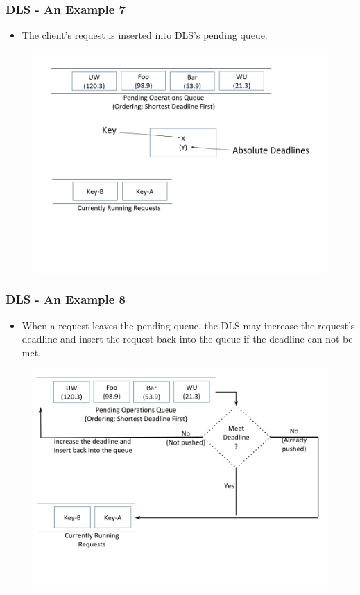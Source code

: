 \documentclass{beamer}
\begin{document}
\begin{frame}
  \frametitle{DLS - An Example 7}
  \begin{itemize}
  \item The client's request is inserted into DLS's pending queue.
  \end{itemize}
  \begin{figure}
    \begin{center}
      \centerline{\includegraphics[scale=0.38]{img/DLS_Example8.png}}
    \end{center}
  \end{figure}
\end{frame}

\begin{frame}
  \frametitle{DLS - An Example 8}
  \begin{itemize}
  \item When a request leaves the pending queue, the DLS may increase the
    request's deadline and insert the request back into the queue if the
    deadline can not be met.
  \end{itemize}
  \begin{figure}
    \begin{center}
      \centerline{\includegraphics[scale=0.35]{img/DLS_Example9.png}}
    \end{center}
  \end{figure}
\end{frame}
\end{document}
